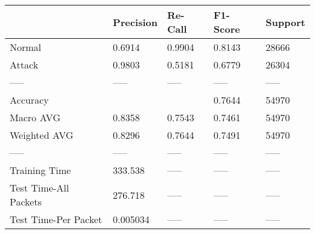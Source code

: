 \begin{tabular}{lllll}
\toprule
{} & Precision & Re-Call & F1-Score & Support \\
\midrule
Normal                &    0.6914 &  0.9904 &   0.8143 &   28666 \\
Attack                &    0.9803 &  0.5181 &   0.6779 &   26304 \\
-----                 &     ----- &   ----- &    ----- &   ----- \\
Accuracy              &           &         &   0.7644 &   54970 \\
Macro AVG             &    0.8358 &  0.7543 &   0.7461 &   54970 \\
Weighted AVG          &    0.8296 &  0.7644 &   0.7491 &   54970 \\
-----                 &     ----- &   ----- &    ----- &   ----- \\
Training Time         &   333.538 &   ----- &    ----- &   ----- \\
Test Time-All Packets &   276.718 &   ----- &    ----- &   ----- \\
Test Time-Per Packet  &  0.005034 &   ----- &    ----- &   ----- \\
\bottomrule
\end{tabular}
